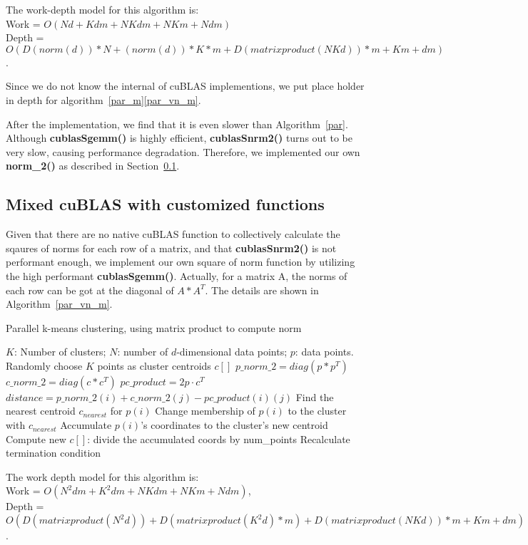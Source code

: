 \vspace{5mm}
\noindent
The work-depth model for this algorithm is: \\
Work = $O(Nd + Kdm + NKdm + NKm + Ndm)$ \\
Depth = $O(D(norm(d))*N + (norm(d))*K*m + D(matrix product(NKd))*m + Km + dm)$.

\vspace{3mm}

Since we do not know the internal of cuBLAS implementions, we put place holder
in depth for algorithm~\ref{par_m}\ref{par_vn_m}. 

After the implementation, we find that it is even slower than Algorithm~\ref{par}.
Although \textbf{cublasSgemm()} is highly efficient, \textbf{cublasSnrm2()} 
turns out to be very slow, causing performance degradation.
Therefore, we implemented our own \textbf{norm\_2()} as described in 
Section~\ref{ss:mix}.


\subsection{Mixed cuBLAS with customized functions}
\label{ss:mix}

Given that there are no native cuBLAS function to collectively calculate the
sqaures of norms for each row of a matrix, and that \textbf{cublasSnrm2()} is
not performant enough, we implement our own square of norm function by utilizing
the high performant \textbf{cublasSgemm()}.
Actually, for a matrix A, the norms of each row can be got at the diagonal of 
$A * A^T$. The details are shown in Algorithm~\ref{par_vn_m}. 

\begin{algorithm}[!h]
  \caption{Parallel k-means clustering, using matrix product to compute norm} \label{par_vn_m}
  \begin{algorithmic}[1]
    \INPUT $K$: Number of clusters; $N$: number of $d$-dimensional data points; $p$: data points.
     \label{alg:pm2}
    \State Randomly choose $K$ points as cluster centroids $c[]$
    \State $p\_norm\_2 = diag(p * p^T)$
    \State $c\_norm\_2 = diag(c * c^T)$
    \State $pc\_product = 2 p \cdot c^T$
    \State $distance = p\_norm\_2(i) + c\_norm\_2(j) - pc\_product(i)(j)$
    \EndFor
    \State Find the nearest centroid $c_{nearest}$ for $p(i)$
    \State Change membership of $p(i)$ to the cluster with $c_{nearest}$
    \State Accumulate $p(i)$'s coordinates to the cluster's new centroid
    \EndParFor
    \State Compute new $c[]$: divide the accumulated coords by num\_points
    \State Recalculate termination condition
    \EndWhile
    \EndFunction
  \end{algorithmic}
\end{algorithm}

\vspace{5mm}
\noindent
The work depth model for this algorithm is: \\
Work = $O(N^2dm + K^2dm + NKdm + NKm + Ndm)$, \\
Depth = $O(D(matrix product(N^2d)) + D(matrix product(K^2d)*m) + D(matrix product(NKd))*m+ Km + dm)$.
